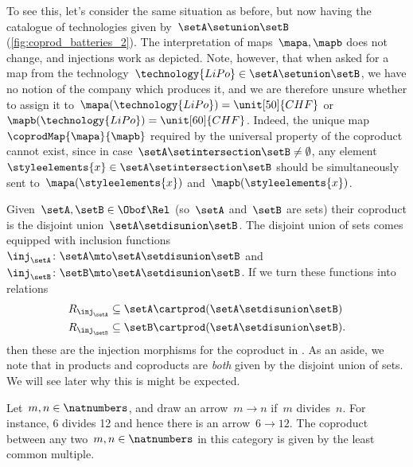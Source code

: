 \begin{example}
	To see this, let's consider the same situation as before, but now having the catalogue of technologies given by~$\setA\setunion \setB$ (\cref{fig:coprod_batteries_2}).
	The interpretation of maps~$\mapa,\mapb$ does not change, and injections work as depicted.
	Note, however, that when asked for a map from the technology~$\technology{LiPo}\in \setA\setunion \setB$, we have no notion of the company which produces it, and we are therefore unsure whether to assign it to~$\mapa(\technology{LiPo})=\unit[50]{CHF}$ or~$\mapb(\technology{LiPo})=\unit[60]{CHF}$.
	Indeed, the unique map~$\coprodMap{\mapa}{\mapb}$ required by the universal property of the coproduct cannot exist, since in case~$\setA\setintersection \setB\neq \emptyset$, any element~$\styleelements{x}\in \setA\setintersection \setB$ should be simultaneously sent to~$\mapa(\styleelements{x})$ and~$\mapb(\styleelements{x})$.
\end{example}


\begin{example}
	Given~$\setA,\setB\in \Obof\Rel$ (so~$\setA$ and~$\setB$ are sets) their coproduct is the disjoint union~$\setA \setdisunion \setB$.
	The disjoint union of sets comes equipped with inclusion functions~$\inj_\setA\colon \setA\mto \setA \setdisunion\setB$ and~$\inj_\setB\colon \setB\mto \setA \setdisunion\setB$.
	If we turn these functions into relations
	\begin{equation*}
		\begin{aligned}
			R_{\inj_\setA} & \subseteq \setA\cartprod (\setA \setdisunion\setB)  \\
			R_{\inj_\setB} & \subseteq \setB\cartprod (\setA \setdisunion\setB).
		\end{aligned}
	\end{equation*}
	then these are the injection morphisms for the coproduct in \Rel.
	As an aside, we note that in \Rel products and coproducts are \emph{both} given by the disjoint union of sets.
	We will see later why this is might be expected.
\end{example}

\begin{example}
	Let~$m,n\in \natnumbers$, and draw an arrow~$m\to n$ if~$m$ divides~$n$.
	For instance, 6 divides 12 and hence there is an arrow~$6\to 12$.
	The coproduct between any two~$m,n\in \natnumbers$ in this category is given by the least common multiple.
\end{example}

